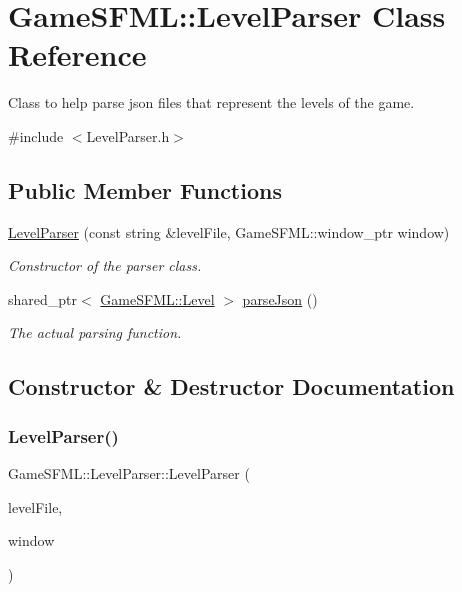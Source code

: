 \hypertarget{classGameSFML_1_1LevelParser}{}\section{Game\+S\+F\+ML\+:\+:Level\+Parser Class Reference}
\label{classGameSFML_1_1LevelParser}


Class to help parse json files that represent the levels of the game.  




{\ttfamily \#include $<$Level\+Parser.\+h$>$}

\subsection*{Public Member Functions}
\begin{DoxyCompactItemize}
\item 
\hyperlink{classGameSFML_1_1LevelParser_a0c17b871d137992c985c8b52412af7d6}{Level\+Parser} (const string \&level\+File, Game\+S\+F\+M\+L\+::window\+\_\+ptr window)
\begin{DoxyCompactList}\small\item\em Constructor of the parser class. \end{DoxyCompactList}\item 
shared\+\_\+ptr$<$ \hyperlink{classGameSFML_1_1Level}{Game\+S\+F\+M\+L\+::\+Level} $>$ \hyperlink{classGameSFML_1_1LevelParser_a11eb8b7c40e1dad49b88de4d5c05bdbf}{parse\+Json} ()
\begin{DoxyCompactList}\small\item\em The actual parsing function. \end{DoxyCompactList}\end{DoxyCompactItemize}


\subsection{Constructor \& Destructor Documentation}
\mbox{\label{classGameSFML_1_1LevelParser_a0c17b871d137992c985c8b52412af7d6}} 
\subsubsection{\texorpdfstring{Level\+Parser()}{LevelParser()}}
{\footnotesize\ttfamily Game\+S\+F\+M\+L\+::\+Level\+Parser\+::\+Level\+Parser (\begin{DoxyParamCaption}\item[{const string \&}]{level\+File,  }\item[{Game\+S\+F\+M\+L\+::window\+\_\+ptr}]{window }\end{DoxyParamCaption})}


